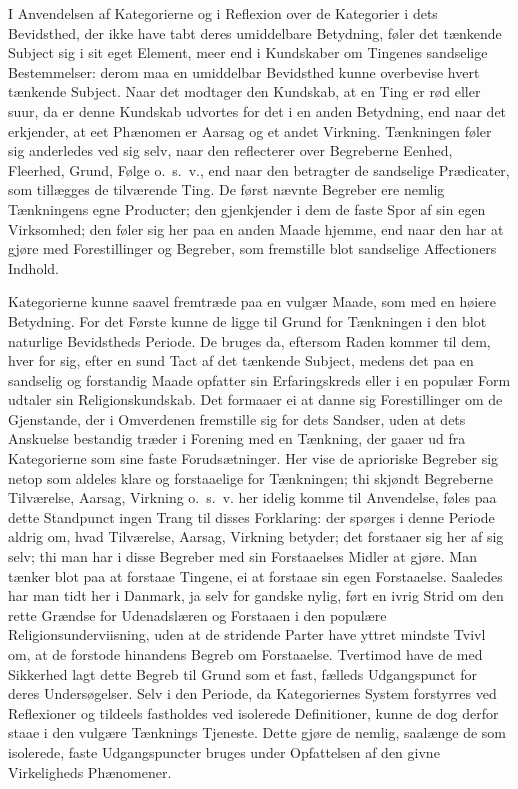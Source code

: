 \documentclass[12pt]{article}
\newcommand{\opage}[1]{\marginnote{\footnotesize\textit{[#1]}}}
\begin{document}
I Anvendelsen af Kategorierne og i Reflexion over de Kategorier i dets
Bevidsthed, der ikke have tabt deres umiddelbare Betydning, føler det tænkende
Subject sig i sit eget Element, meer end i Kundskaber om Tingenes sandselige
Bestemmelser: derom maa en umiddelbar Bevidsthed kunne overbevise hvert tænkende
Subject. Naar det modtager den Kundskab, at en Ting er rød eller suur, da er
denne Kundskab udvortes for det i en anden Betydning, end naar det erkjender, at
eet Phænomen er Aarsag og et andet Virkning. Tænkningen føler sig anderledes ved
sig selv, naar den reflecterer over Begreberne Eenhed, Fleerhed, Grund, Følge
o.\ s.\ v., end naar den betragter de sandselige Prædicater, som tillægges de
tilværende Ting. De først nævnte Begreber ere nemlig Tænkningens egne Producter;
den gjenkjender i dem de faste Spor af sin egen Virksomhed; den føler sig her paa
en anden Maade hjemme, end naar den har at gjøre med Forestillinger og Begreber,
som fremstille blot sandselige Affectioners Indhold.

Kategorierne kunne saavel fremtræde paa en vulgær Maade, som med en høiere
Betydning. For det Første kunne de ligge til Grund for Tænkningen i den blot
naturlige Bevidstheds Periode. De bruges da, eftersom Raden kommer til dem, hver
for sig, efter en sund Tact af det tænkende Subject, medens det paa en sandselig
og forstandig Maade opfatter sin Erfaringskreds eller i en populær Form udtaler
sin Religionskundskab. Det formaaer ei at danne sig Forestillinger om de
Gjenstande, der i Omverdenen fremstille sig for dets Sandser, uden at dets
Anskuelse bestandig træder i Forening med en Tænkning, der gaaer ud fra
Kategorierne som sine faste Forudsætninger. Her \opage{199}vise de aprioriske
Begreber sig netop som aldeles klare og forstaaelige for Tænkningen; thi skjøndt
Begreberne Tilværelse, Aarsag, Virkning o.\ s.\ v. her idelig komme til
Anvendelse, føles paa dette Standpunct ingen Trang til disses Forklaring: der
spørges i denne Periode aldrig om, hvad Tilværelse, Aarsag, Virkning betyder;
det forstaaer sig her af sig selv; thi man har i disse Begreber med sin
Forstaaelses Midler at gjøre. Man tænker blot paa at forstaae Tingene, ei at
forstaae sin egen Forstaaelse. Saaledes har man tidt her i Danmark, ja selv for
gandske nylig, ført en ivrig Strid om den rette Grændse for Udenadslæren og
Forstaaen i den populære Religionsunderviisning, uden at de stridende Parter
have yttret mindste Tvivl om, at de forstode hinandens Begreb om Forstaaelse.
Tvertimod have de med Sikkerhed lagt dette Begreb til Grund som et fast, fælleds
Udgangspunct for deres Undersøgelser. Selv i den Periode, da Kategoriernes System
forstyrres ved Reflexioner og tildeels fastholdes ved isolerede Definitioner,
kunne de dog derfor staae i den vulgære Tænknings Tjeneste. Dette gjøre de
nemlig, saalænge de som isolerede, faste Udgangspuncter bruges under Opfattelsen
af den givne Virkeligheds Phænomener.
\end{document}
